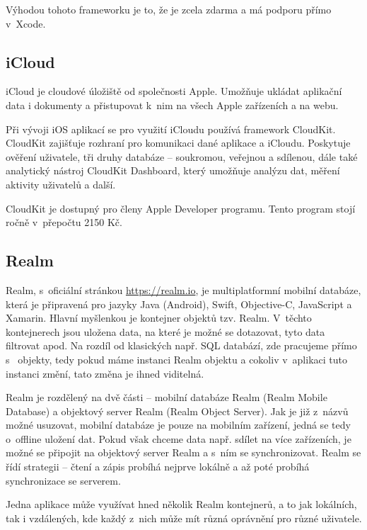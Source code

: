 \documentclass[thesis=M,czech]{FITthesis}[2012/06/26]
\begin{document}
Výhodou tohoto frameworku je to, že je zcela zdarma a má podporu přímo v~Xcode. \cite{CoreDataXcode}

\subsection{iCloud}
iCloud je cloudové úložiště od společnosti Apple. Umožňuje ukládat aplikační data i dokumenty a přistupovat k~nim na všech Apple zařízeních a na webu. \cite{iCloud}

Při vývoji iOS aplikací se pro využití iCloudu používá framework CloudKit. CloudKit zajišťuje rozhraní pro komunikaci dané aplikace a iCloudu. \cite{CloudKitDoc} Poskytuje ověření uživatele, tři druhy databáze -- soukromou, veřejnou a sdílenou, dále také analytický nástroj CloudKit Dashboard, který umožňuje analýzu dat, měření aktivity uživatelů a další. \cite{CloudKit}

CloudKit je dostupný pro členy Apple Developer programu. \cite{AppleDeveloperProgram} Tento program stojí ročně v~přepočtu 2150 Kč. \cite{AppleDeveloperProgramPrice} 

\subsection{Realm}
Realm, s~oficiální stránkou \url{https://realm.io}, je multiplatformní mobilní databáze, která je připravená pro jazyky Java (Android), Swift, Objective-C, JavaScript a Xamarin. Hlavní myšlenkou je kontejner objektů tzv. Realm. V~těchto kontejnerech jsou uložena data, na které je možné se dotazovat, tyto data filtrovat apod. Na rozdíl od klasických např. SQL databází, zde pracujeme přímo s~ objekty, tedy pokud máme instanci Realm objektu a cokoliv v~aplikaci tuto instanci změní, tato změna je ihned viditelná.

Realm je rozdělený na dvě části -- mobilní databáze Realm (Realm Mobile Database) a objektový server Realm (Realm Object Server). Jak je již z~názvů možné usuzovat, mobilní databáze je pouze na mobilním zařízení, jedná se tedy o~offline uložení dat. Pokud však chceme data např. sdílet na více zařízeních, je možné se připojit na objektový server Realm a s~ním se synchronizovat. Realm se řídí strategii  -- čtení a zápis probíhá nejprve lokálně a až poté probíhá synchronizace se serverem.

Jedna aplikace může využívat hned několik Realm kontejnerů, a to jak lokálních, tak i vzdálených, kde každý z~nich může mít různá oprávnění pro různé uživatele.
\end{document}
